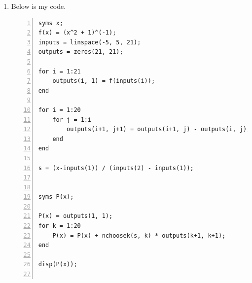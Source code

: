\documentclass{article}
\begin{document}
\begin{enumerate}
    \item Below is my code.
    \begin{lstlisting}[frame=single, numbers=left, style=Matlab-editor]
syms x;
f(x) = (x^2 + 1)^(-1);
inputs = linspace(-5, 5, 21);
outputs = zeros(21, 21);

for i = 1:21
    outputs(i, 1) = f(inputs(i));
end

for i = 1:20
    for j = 1:i
        outputs(i+1, j+1) = outputs(i+1, j) - outputs(i, j);
    end
end

s = (x-inputs(1)) / (inputs(2) - inputs(1));


syms P(x);

P(x) = outputs(1, 1);
for k = 1:20
    P(x) = P(x) + nchoosek(s, k) * outputs(k+1, k+1);
end

disp(P(x));


\end{lstlisting}
\end{enumerate}
\end{document}
